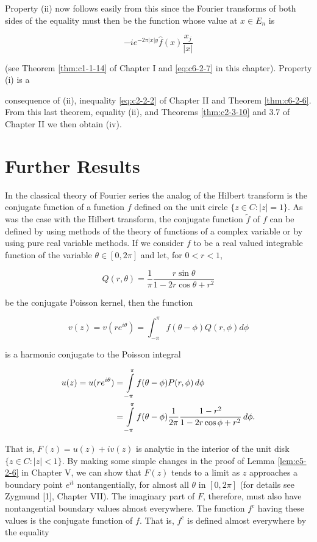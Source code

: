 Property (ii) now follows easily from this since the Fourier transforms of both sides of the equality must then be the function whose value at $x \in E_n$ is

\[
- i e^{-2\pi|x|y}\hat{f}(x) \frac{x_{j}}{|x|}
\]

(see Theorem \ref{thm:c1-1-14} of Chapter I and \eqref{eq:c6-2-7} in this chapter). Property (i) is a

consequence of (ii), inequality \eqref{eq:c2-2-2} of Chapter II and Theorem \ref{thm:c6-2-6}. From this last theorem, equality (ii), and Theorems \ref{thm:c2-3-10} and 3.7 of Chapter II we then obtain (iv).

\section{Further Results}

 In the classical theory of Fourier series the analog of the Hilbert transform is the conjugate function of a function $f$ defined on the unit circle $\{z \in C: |z| = 1\}$. As was the case with the Hilbert transform, the conjugate function $\tilde{f}$ of $f$ can be defined by using methods of the theory of functions of a complex variable or by using pure real variable methods. If we consider $f$ to be a real valued integrable function of the variable $\theta \in [0, 2\pi]$ and let, for $0 < r < 1$,

\[
Q(r,\theta)=\frac{1}{\pi}\frac{r\sin\theta}{1-2r\cos\theta+r^{2}}
\]

be the conjugate Poisson kernel, then the function

\[
v(z)=v(r e^{i\theta})=\int_{-\pi}^{\pi}f(\theta-\phi)Q(r,\phi)d\phi
\]

is a harmonic conjugate to the Poisson integral

\[
\begin{aligned}{u(z)=u(r e^{i\theta})}&{{}=\intop_{-\pi}^{\pi}f(\theta-\phi)P(r,\phi)\,d\phi}\\ {}&{{}=\intop_{-\pi}^{\pi}f(\theta-\phi)\frac{1}{2\pi}\frac{1-r^{2}}{1-2r\cos\phi+r^{2}}\,d\phi.}\\ \end{aligned}
\]

That is, $F(z) = u(z) + iv(z)$ is analytic in the interior of the unit disk $\{z \in C: |z| < 1\}$. By making some simple changes in the proof of Lemma \ref{lem:c5-2-6} in Chapter V, we can show that $F(z)$ tends to a limit as $z$ approaches a boundary point $e^{it}$ nontangentially, for almost all $\theta$ in $[0, 2\pi]$ (for details see Zygmund [1], Chapter VII). The imaginary part of $F$, therefore, must also have nontangential boundary values almost everywhere. The function $f^c$ having these values is the conjugate function of $f$. That is, $f^c$ is defined almost everywhere by the equality

